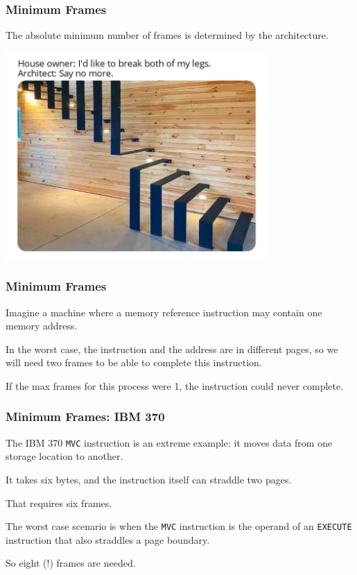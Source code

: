 \begin{frame}
\frametitle{Minimum Frames}

The absolute minimum number of frames is determined by the architecture. 

\begin{center}
	\includegraphics[width=0.75\textwidth]{images/architecture.jpg}
\end{center}

\end{frame}

\begin{frame}
\frametitle{Minimum Frames}



Imagine a machine where a memory reference instruction may contain one memory address.

In the worst case, the instruction and the address are in different pages, so we will need two frames to be able to complete this instruction.

If the max frames for this process were 1, the instruction could never complete.

\end{frame}

\begin{frame}
\frametitle{Minimum Frames: IBM 370}

The IBM 370 \texttt{MVC} instruction is an extreme example: it moves data from one storage location to another. 

It takes six bytes, and the instruction itself can straddle two pages. 

That requires six frames. 

The worst case scenario is when the \texttt{MVC} instruction is the operand of an \texttt{EXECUTE} instruction that also straddles a page boundary. 

So eight (!) frames are needed.


\end{frame}

